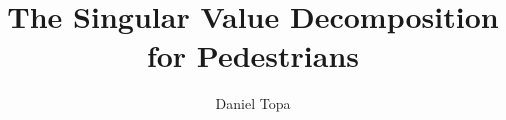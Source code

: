 \documentclass[theoremb]{gsm-l}
\begin{document}
\frontmatter

\title{The Singular Value Decomposition\\for Pedestrians}

\author{Daniel Topa}

\maketitle


\end{document}
